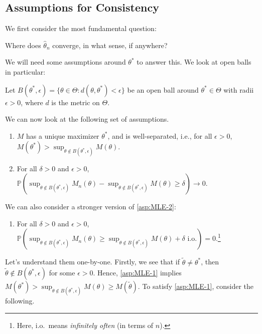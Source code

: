 \subsection{Assumptions for Consistency}
We first consider the most fundamental question:

\begin{problem*}
	Where does \(\hat{\theta} _n\) converge, in what sense, if anywhere?
\end{problem*}

We will need some assumptions around \(\theta ^{\ast} \) to answer this. We look at open balls in particular:

\begin{notation}
	Let \(B(\theta ^{\ast} , \epsilon ) = \{ \theta \in \Theta \colon d(\theta , \theta ^{\ast} ) < \epsilon \} \) be an open ball around \(\theta ^{\ast} \in \Theta \) with radii \(\epsilon > 0\), where \(d\) is the metric on \(\Theta \).
\end{notation}

We can now look at the following set of assumptions.

\begin{enumerate}[label=(A\arabic*)]
	\item\label{asp:MLE-1} \(M\) has a unique maximizer \(\theta ^{\ast} \), and is well-separated, i.e., for all \(\epsilon > 0\), \(M(\theta ^{\ast} ) > \sup _{\theta \notin B(\theta ^{\ast} , \epsilon )} M(\theta )\).
	\item\label{asp:MLE-2} For all \(\delta > 0\) and \(\epsilon > 0\), \(\mathbb{P} ( \sup _{\theta \notin B(\theta ^{\ast} , \epsilon )} M_n(\theta ) - \sup _{\theta \notin B(\theta ^{\ast} , \epsilon )} M(\theta ) \geq \delta ) \to 0\).
\end{enumerate}
We can also consider a stronger version of \autoref{asp:MLE-2}:
\begin{enumerate}[resume, label=(A\arabic*)]
	\item\label{asp:MLE-3} For all \(\delta > 0\) and \(\epsilon > 0\), \(\mathbb{P} ( \sup _{\theta \notin B(\theta ^{\ast} , \epsilon )} M_n(\theta ) \geq \sup _{\theta \notin B(\theta ^{\ast} , \epsilon )} M(\theta ) + \delta \text{ i.o.} ) = 0\).\footnote{Here, i.o.\ means \emph{infinitely often} (in terms of \(n\)).}
\end{enumerate}

Let's understand them one-by-one. Firstly, we see that if \(\widetilde{\theta} \neq \theta ^{\ast} \), then \(\widetilde{\theta} \notin B(\theta ^{\ast} , \epsilon )\) for some \(\epsilon > 0\). Hence, \autoref{asp:MLE-1} implies \(M(\theta ^{\ast} ) > \sup _{\theta \notin B(\theta ^{\ast} , \epsilon )} M(\theta ) \geq M(\widetilde{\theta} )\). To satisfy \autoref{asp:MLE-1}, consider the following.

